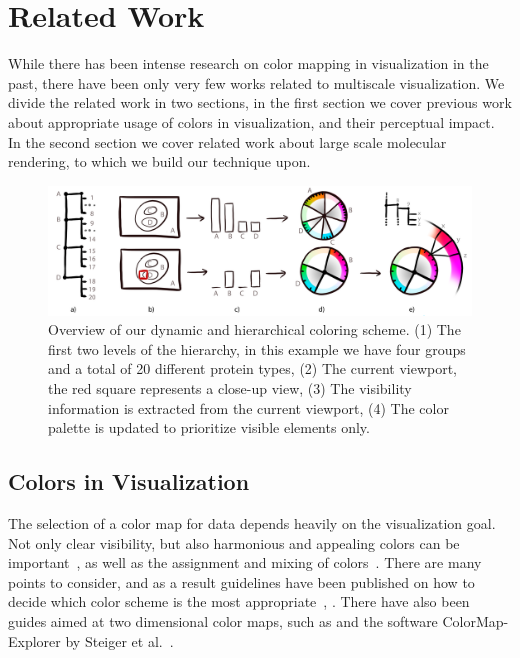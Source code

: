 \documentclass[review,journal]{vgtc}         %
\begin{document}
	\section{Related Work}
	While there has been intense research on color mapping in visualization in the past, there have been only very few works related to multiscale visualization.
	We divide the related work in two sections, in the first section we cover previous work about appropriate usage of colors in visualization, and their perceptual impact. 
	In the second section we cover related work about large scale molecular rendering, to which we build our technique upon.
	
	\begin{figure}[t]
		\centering
		\includegraphics[width=0.95\linewidth]{Figures/coloroverview}
		\caption{Overview of our dynamic and hierarchical coloring scheme. (1) The first two levels of the hierarchy, in this example we have four groups and a total of 20 different protein types, (2) The current viewport, the red square represents a close-up view, (3) The visibility information is extracted from the current viewport, (4) The color palette is updated to prioritize visible elements only.}
		\label{fig:coloroverview}
	\end{figure}
	
	
	
	\subsection{Colors in Visualization}
	The selection of  a color map for data depends heavily on the visualization goal. 
	Not only clear visibility, but also harmonious and appealing colors can be important~\cite{ihaka2003colour}, as well as the assignment and mixing of colors~\cite{wang2008color}. 
	There are many points to consider, and as a result guidelines have been published on how to decide which color scheme is the most appropriate~\cite{bergman1995rule}, \cite{healey1996choosing}. There have also been guides aimed at two dimensional color maps, such as \cite{bernard2015survey} and the software ColorMap-Explorer by Steiger et al.~\cite{steiger2015explorative}.
	
\end{document}
